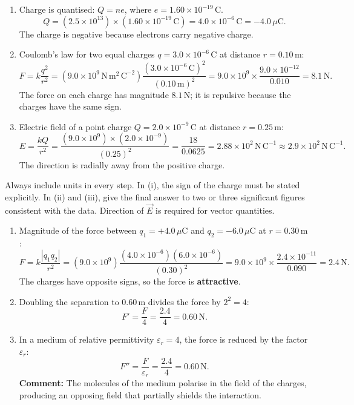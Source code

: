 \documentclass[11pt]{article}
\begin{document}
\begin{corrige}
\begin{enumerate}
\item Charge is quantised: $Q = ne$, where $e = 1.60\times 10^{-19}\,\mathrm{C}$.
\[
Q = (2.5\times 10^{13})\times(1.60\times 10^{-19}\,\mathrm{C}) = 4.0\times 10^{-6}\,\mathrm{C} = -4.0\,\mu\mathrm{C}.
\]
The charge is negative because electrons carry negative charge.
\item Coulomb's law for two equal charges $q = 3.0\times 10^{-6}\,\mathrm{C}$ at distance $r = 0.10\,\mathrm{m}$:
\[
F = k\frac{q^{2}}{r^{2}} = (9.0\times 10^{9}\,\mathrm{N\,m^{2}\,C^{-2}})\frac{(3.0\times 10^{-6}\,\mathrm{C})^{2}}{(0.10\,\mathrm{m})^{2}}
= 9.0\times 10^{9}\times\frac{9.0\times 10^{-12}}{0.010} = 8.1\,\mathrm{N}.
\]
The force on each charge has magnitude $8.1\,\mathrm{N}$; it is repulsive because the charges have the same sign.
\item Electric field of a point charge $Q = 2.0\times 10^{-9}\,\mathrm{C}$ at distance $r = 0.25\,\mathrm{m}$:
\[
E = \frac{kQ}{r^{2}} = \frac{(9.0\times 10^{9})\times(2.0\times 10^{-9})}{(0.25)^{2}} = \frac{18}{0.0625} = 2.88\times 10^{2}\,\mathrm{N\,C^{-1}} \approx 2.9\times 10^{2}\,\mathrm{N\,C^{-1}}.
\]
The direction is radially away from the positive charge.
\end{enumerate}
\end{corrige}

\begin{attention}
Always include units in every step. In (i), the sign of the charge must be stated explicitly. In (ii) and (iii), give the final answer to two or three significant figures consistent with the data. Direction of $\vec{E}$ is required for vector quantities.
\end{attention}

\begin{corrige}
\begin{enumerate}
\item Magnitude of the force between $q_{1} = +4.0\,\mu\mathrm{C}$ and $q_{2} = -6.0\,\mu\mathrm{C}$ at $r = 0.30\,\mathrm{m}$:
\[
F = k\frac{|q_{1}q_{2}|}{r^{2}} = (9.0\times 10^{9})\frac{(4.0\times 10^{-6})(6.0\times 10^{-6})}{(0.30)^{2}}
= 9.0\times 10^{9}\times\frac{2.4\times 10^{-11}}{0.090} = 2.4\,\mathrm{N}.
\]
The charges have opposite signs, so the force is \textbf{attractive}.
\item Doubling the separation to $0.60\,\mathrm{m}$ divides the force by $2^{2} = 4$:
\[
F' = \frac{F}{4} = \frac{2.4}{4} = 0.60\,\mathrm{N}.
\]
\item In a medium of relative permittivity $\varepsilon_{r} = 4$, the force is reduced by the factor $\varepsilon_{r}$:
\[
F'' = \frac{F}{\varepsilon_{r}} = \frac{2.4}{4} = 0.60\,\mathrm{N}.
\]
\textbf{Comment:} The molecules of the medium polarise in the field of the charges, producing an opposing field that partially shields the interaction.
\end{enumerate}
\end{corrige}
\end{document}
